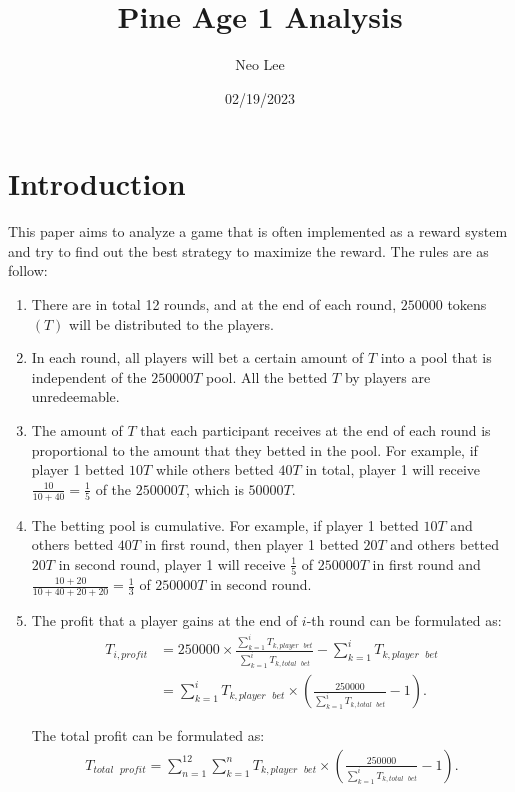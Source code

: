 \documentclass{article}
\title{Pine Age 1 Analysis}
\author{Neo Lee}
\date{02/19/2023}
\begin{document}
 

\maketitle 

\section*{Introduction}
This paper aims to analyze a game that is often implemented as a reward system and try to find out the best strategy to maximize the reward.
The rules are as follow:

\begin{enumerate}
    \item 
    There are in total 12 rounds, and at the end of each round, $\num{250000}$ tokens $(T)$ will be distributed to the players.

    \item
    In each round, all players will bet a certain amount of $T$ into a pool that is independent of the $\num{250000}T$ pool. 
    All the betted $T$ by players are unredeemable. 

    \item
    The amount of $T$ that each participant receives at the end of each round is proportional to the amount that they betted in the pool. 
    For example, if player 1 betted $10T$ while others betted $40T$ in total, player 1 will receive $\frac{10}{10+40}=\frac{1}{5}$ of the $\num{250000}T$, which is $\num{50000}T$.

    \item 
    The betting pool is cumulative. For example, if player 1 betted $10T$ and others betted $40T$ in first round, then player 1 betted $20T$ and others betted $20T$ in second round, player 1 will receive $\frac{1}{5}$ of $\num{250000}T$ in first round and $\frac{10+20}{10+40+20+20}=\frac{1}{3}$ of $\num{250000}T$ in second round.

    \item
    The profit that a player gains at the end of $i$-th round can be formulated as:
    \begin{align}
        T_{i,profit} & = \num{250000}\times \frac{\sum_{k=1}^{i}T_{k,player \text{ }bet}}{\sum_{k=1}^{i}T_{k,total \text{ }bet}}-\sum_{k=1}^{i}T_{k,player \text{ }bet} \\
        & = \sum_{k=1}^{i}T_{k,player \text{ }bet} \times \left(\frac{\num{250000}}{\sum_{k=1}^{i}T_{k,total \text{ }bet}}-1\right).
    \end{align}

    The total profit can be formulated as:
    \begin{align}
        T_{total \text{ }profit} = \sum_{n=1}^{12}\sum_{k=1}^{n}T_{k,player \text{ }bet} \times \left(\frac{\num{250000}}{\sum_{k=1}^{i}T_{k,total \text{ }bet}}-1\right).
    \end{align}
    
\end{enumerate}
\end{document}
